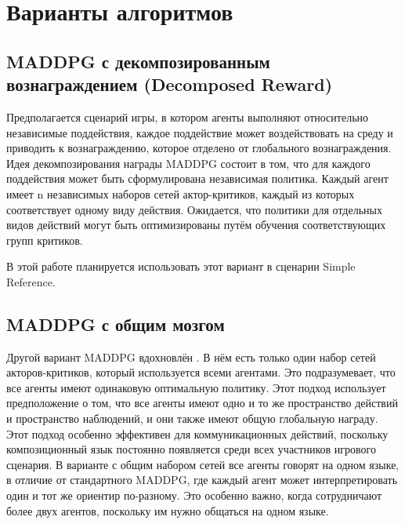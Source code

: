 \section{Варианты алгоритмов}

\subsection{MADDPG с декомпозированным вознаграждением (Decomposed Reward)}

Предполагается сценарий игры, в котором агенты выполняют относительно независимые поддействия, каждое поддействие может воздействовать на среду и приводить к вознаграждению, которое отделено от глобального вознаграждения. Идея декомпозирования награды MADDPG состоит в том, что для каждого поддействия может быть сформулирована независимая политика. Каждый агент имеет n независимых наборов сетей актор-критиков, каждый из которых соответствует одному виду действия. Ожидается, что политики для отдельных видов действий могут быть оптимизированы путём обучения соответствующих групп критиков.

В этой работе планируется использовать этот вариант в сценарии Simple Reference.

\subsection{MADDPG с общим мозгом}

Другой вариант MADDPG вдохновлён \cite{mordatch2017emergence}. В нём есть только один набор сетей акторов-критиков, который используется всеми агентами. Это подразумевает, что все агенты имеют одинаковую оптимальную политику. Этот подход использует предположение о том, что все агенты имеют одно и то же пространство действий и пространство наблюдений, и они также имеют общую глобальную награду. Этот подход особенно эффективен для коммуникационных действий, поскольку композиционный язык постоянно появляется среди всех участников игрового сценария. В варианте с общим набором сетей все агенты говорят на одном языке, в отличие от стандартного MADDPG, где каждый агент может интерпретировать один и тот же ориентир по-разному. Это особенно важно, когда сотрудничают более двух агентов, поскольку им нужно общаться на одном языке.
